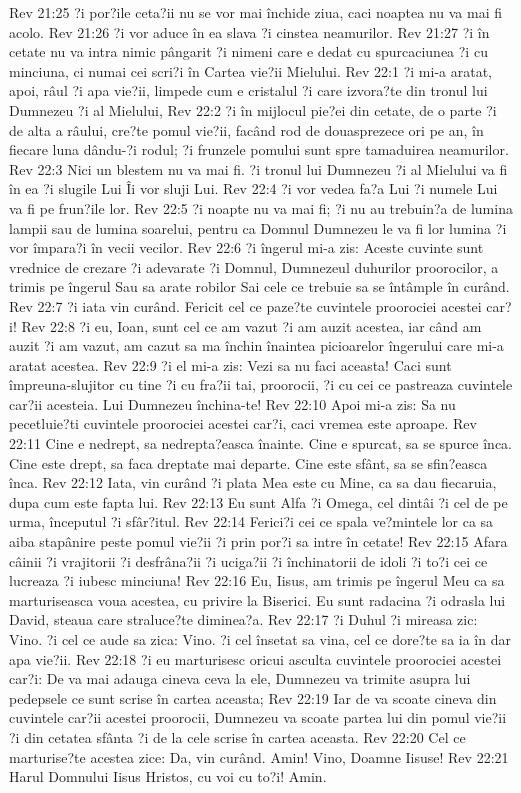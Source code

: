 Rev 21:25  ?i por?ile ceta?ii nu se vor mai închide ziua, caci noaptea nu va mai fi acolo.
Rev 21:26  ?i vor aduce în ea slava ?i cinstea neamurilor.
Rev 21:27  ?i în cetate nu va intra nimic pângarit ?i nimeni care e dedat cu spurcaciunea ?i cu minciuna, ci numai cei scri?i în Cartea vie?ii Mielului.
Rev 22:1  ?i mi-a aratat, apoi, râul ?i apa vie?ii, limpede cum e cristalul ?i care izvora?te din tronul lui Dumnezeu ?i al Mielului,
Rev 22:2  ?i în mijlocul pie?ei din cetate, de o parte ?i de alta a râului, cre?te pomul vie?ii, facând rod de douasprezece ori pe an, în fiecare luna dându-?i rodul; ?i frunzele pomului sunt spre tamaduirea neamurilor.
Rev 22:3  Nici un blestem nu va mai fi. ?i tronul lui Dumnezeu ?i al Mielului va fi în ea ?i slugile Lui Îi vor sluji Lui.
Rev 22:4  ?i vor vedea fa?a Lui ?i numele Lui va fi pe frun?ile lor.
Rev 22:5  ?i noapte nu va mai fi; ?i nu au trebuin?a de lumina lampii sau de lumina soarelui, pentru ca Domnul Dumnezeu le va fi lor lumina ?i vor împara?i în vecii vecilor.
Rev 22:6  ?i îngerul mi-a zis: Aceste cuvinte sunt vrednice de crezare ?i adevarate ?i Domnul, Dumnezeul duhurilor proorocilor, a trimis pe îngerul Sau sa arate robilor Sai cele ce trebuie sa se întâmple în curând.
Rev 22:7  ?i iata vin curând. Fericit cel ce paze?te cuvintele proorociei acestei car?i!
Rev 22:8  ?i eu, Ioan, sunt cel ce am vazut ?i am auzit acestea, iar când am auzit ?i am vazut, am cazut sa ma închin înaintea picioarelor îngerului care mi-a aratat acestea.
Rev 22:9  ?i el mi-a zis: Vezi sa nu faci aceasta! Caci sunt împreuna-slujitor cu tine ?i cu fra?ii tai, proorocii, ?i cu cei ce pastreaza cuvintele car?ii acesteia. Lui Dumnezeu închina-te!
Rev 22:10  Apoi mi-a zis: Sa nu pecetluie?ti cuvintele proorociei acestei car?i, caci vremea este aproape.
Rev 22:11  Cine e nedrept, sa nedrepta?easca înainte. Cine e spurcat, sa se spurce înca. Cine este drept, sa faca dreptate mai departe. Cine este sfânt, sa se sfin?easca înca.
Rev 22:12  Iata, vin curând ?i plata Mea este cu Mine, ca sa dau fiecaruia, dupa cum este fapta lui.
Rev 22:13  Eu sunt Alfa ?i Omega, cel dintâi ?i cel de pe urma, începutul ?i sfâr?itul.
Rev 22:14  Ferici?i cei ce spala ve?mintele lor ca sa aiba stapânire peste pomul vie?ii ?i prin por?i sa intre în cetate!
Rev 22:15  Afara câinii ?i vrajitorii ?i desfrâna?ii ?i uciga?ii ?i închinatorii de idoli ?i to?i cei ce lucreaza ?i iubesc minciuna!
Rev 22:16  Eu, Iisus, am trimis pe îngerul Meu ca sa marturiseasca voua acestea, cu privire la Biserici. Eu sunt radacina ?i odrasla lui David, steaua care straluce?te diminea?a.
Rev 22:17  ?i Duhul ?i mireasa zic: Vino. ?i cel ce aude sa zica: Vino. ?i cel însetat sa vina, cel ce dore?te sa ia în dar apa vie?ii.
Rev 22:18  ?i eu marturisesc oricui asculta cuvintele proorociei acestei car?i: De va mai adauga cineva ceva la ele, Dumnezeu va trimite asupra lui pedepsele ce sunt scrise în cartea aceasta;
Rev 22:19  Iar de va scoate cineva din cuvintele car?ii acestei proorocii, Dumnezeu va scoate partea lui din pomul vie?ii ?i din cetatea sfânta ?i de la cele scrise în cartea aceasta.
Rev 22:20  Cel ce marturise?te acestea zice: Da, vin curând. Amin! Vino, Doamne Iisuse!
Rev 22:21  Harul Domnului Iisus Hristos, cu voi cu to?i! Amin.


